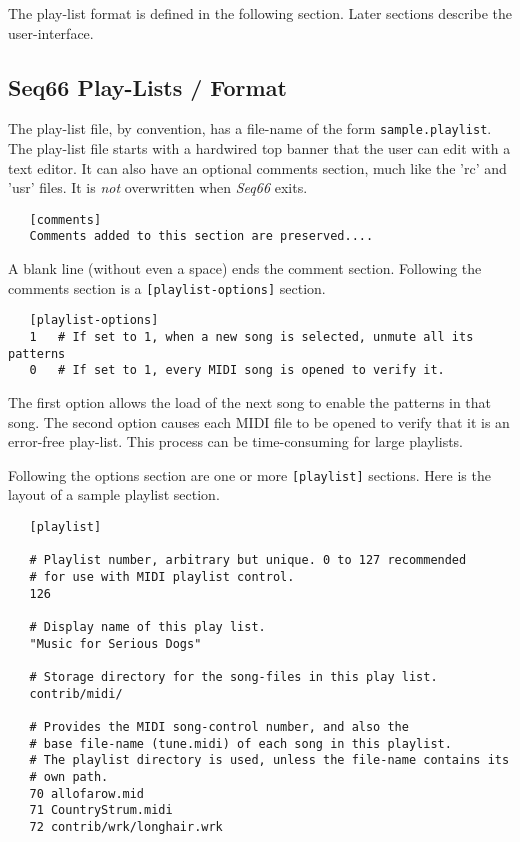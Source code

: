    The play-list format is defined in the following section.
   Later sections describe the user-interface.

\subsection{Seq66 Play-Lists / Format}
\label{subsec:playlist_setup}

   The play-list file, by convention, has a file-name of the form
   \texttt{sample.playlist}.
   The play-list file starts with a hardwired top banner that the user can edit
   with a text editor.  It can also have an optional comments section, much
   like the 'rc' and 'usr' files.  It is \textsl{not} overwritten
   when \textsl{Seq66} exits.

   \begin{verbatim}
   [comments]
   Comments added to this section are preserved....
   \end{verbatim}

   A blank line (without even a space) ends the comment section.
   Following the comments section is a \texttt{[playlist-options]} section.

   \begin{verbatim}
   [playlist-options]
   1   # If set to 1, when a new song is selected, unmute all its patterns
   0   # If set to 1, every MIDI song is opened to verify it.
   \end{verbatim}

   The first option allows the load of the next song to enable the patterns in
   that song.
   The second option causes each MIDI file to be opened to verify that it is an
   error-free play-list.  This process can be time-consuming for large
   playlists.

   Following the options section are one or more \texttt{[playlist]} sections.
   Here is the layout of a sample playlist section.

   \begin{verbatim}
   [playlist]

   # Playlist number, arbitrary but unique. 0 to 127 recommended
   # for use with MIDI playlist control.
   126

   # Display name of this play list.
   "Music for Serious Dogs"

   # Storage directory for the song-files in this play list.
   contrib/midi/

   # Provides the MIDI song-control number, and also the
   # base file-name (tune.midi) of each song in this playlist.
   # The playlist directory is used, unless the file-name contains its
   # own path.
   70 allofarow.mid
   71 CountryStrum.midi
   72 contrib/wrk/longhair.wrk
   \end{verbatim}

